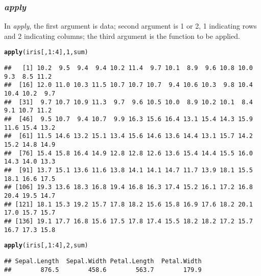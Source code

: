 \documentclass[11pt, a4paper]{article}\usepackage[]{graphicx}\usepackage[]{xcolor}
\makeatletter
\newcommand{\hlnum}[1]{\textcolor[rgb]{0.686,0.059,0.569}{#1}}%
\newcommand{\hlopt}[1]{\textcolor[rgb]{0,0,0}{#1}}%
\newcommand{\hldef}[1]{\textcolor[rgb]{0.345,0.345,0.345}{#1}}%
\newcommand{\hlkwd}[1]{\textcolor[rgb]{0.737,0.353,0.396}{\textbf{#1}}}%
\newenvironment{kframe}{%
 \def\at@end@of@kframe{}%
 \ifinner\ifhmode%
  \def\at@end@of@kframe{\end{minipage}}%
  \begin{minipage}{\columnwidth}%
 \fi\fi%
 \def\FrameCommand##1{\hskip\@totalleftmargin \hskip-\fboxsep
 \colorbox{shadecolor}{##1}\hskip-\fboxsep
     \hskip-\linewidth \hskip-\@totalleftmargin \hskip\columnwidth}%
 \MakeFramed {\advance\hsize-\width
   \@totalleftmargin\z@ \linewidth\hsize
   \@setminipage}}%
 {\par\unskip\endMakeFramed%
 \at@end@of@kframe}
\newenvironment{knitrout}{}{} %
\makeatother
\begin{document}
\subsubsection{\textit{apply}} In \textit{apply}, the first argument is data; second argument is 1 or 2, 1 indicating rows and 2 indicating columns; the third argument is the function to be applied.
\begin{knitrout}
\color{fgcolor}\begin{kframe}
\begin{alltt}
\hlkwd{apply}\hldef{(iris[,} \hlnum{1}\hlopt{:}\hlnum{4}\hldef{],} \hlnum{1}\hldef{, sum)}
\end{alltt}
\begin{verbatim}
##   [1] 10.2  9.5  9.4  9.4 10.2 11.4  9.7 10.1  8.9  9.6 10.8 10.0  9.3  8.5 11.2
##  [16] 12.0 11.0 10.3 11.5 10.7 10.7 10.7  9.4 10.6 10.3  9.8 10.4 10.4 10.2  9.7
##  [31]  9.7 10.7 10.9 11.3  9.7  9.6 10.5 10.0  8.9 10.2 10.1  8.4  9.1 10.7 11.2
##  [46]  9.5 10.7  9.4 10.7  9.9 16.3 15.6 16.4 13.1 15.4 14.3 15.9 11.6 15.4 13.2
##  [61] 11.5 14.6 13.2 15.1 13.4 15.6 14.6 13.6 14.4 13.1 15.7 14.2 15.2 14.8 14.9
##  [76] 15.4 15.8 16.4 14.9 12.8 12.8 12.6 13.6 15.4 14.4 15.5 16.0 14.3 14.0 13.3
##  [91] 13.7 15.1 13.6 11.6 13.8 14.1 14.1 14.7 11.7 13.9 18.1 15.5 18.1 16.6 17.5
## [106] 19.3 13.6 18.3 16.8 19.4 16.8 16.3 17.4 15.2 16.1 17.2 16.8 20.4 19.5 14.7
## [121] 18.1 15.3 19.2 15.7 17.8 18.2 15.6 15.8 16.9 17.6 18.2 20.1 17.0 15.7 15.7
## [136] 19.1 17.7 16.8 15.6 17.5 17.8 17.4 15.5 18.2 18.2 17.2 15.7 16.7 17.3 15.8
\end{verbatim}
\end{kframe}
\end{knitrout}

\begin{knitrout}
\color{fgcolor}\begin{kframe}
\begin{alltt}
\hlkwd{apply}\hldef{(iris[,} \hlnum{1}\hlopt{:}\hlnum{4}\hldef{],} \hlnum{2}\hldef{, sum)}
\end{alltt}
\begin{verbatim}
## Sepal.Length  Sepal.Width Petal.Length  Petal.Width 
##        876.5        458.6        563.7        179.9
\end{verbatim}
\end{kframe}
\end{knitrout}
\end{document}

